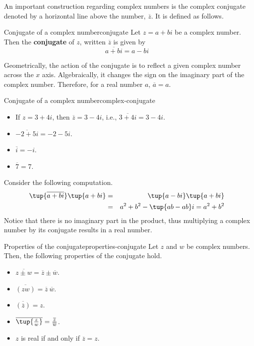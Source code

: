 An important construction regarding complex numbers is the complex
conjugate denoted by a horizontal line above the number, $\overline{z}$. It
is defined as follows.

\begin{definition}{Conjugate of a complex number}{conjugate}
Let $z = a+bi$ be a complex number. Then the \textbf{conjugate} of $z$, written $\overline{z}$ is given by 
\begin{equation*}
\overline{a+bi}= a-bi
\end{equation*}
\end{definition}

Geometrically, the action of the conjugate is to reflect a given complex number across the $x$ axis.
Algebraically, it changes the sign on the imaginary part of the complex number. Therefore, for a real number $a$, $\overline{a} = a$. 

\begin{example}{Conjugate of a complex number}{complex-conjugate}
\begin{itemize}

\item If $z=3+4i$, then $\overline{z}=3-4i$,
i.e., $\overline{3+4i}=3-4i$.

\item $\overline{-2+5i}= -2-5i$.

\item $\overline{i}= -i$.

\item $\overline{7}= 7$.
\end{itemize}
\end{example}

Consider the following computation. 
\begin{eqnarray*}
\tup{\overline{a+bi}} \tup{a+bi} &=&\tup{a-bi}
\tup{a+bi} \\
&=&a^{2}+b^{2}-\tup{ab-ab}i =a^{2}+b^{2}
\end{eqnarray*}
Notice that there is no imaginary part in the product, thus
multiplying a complex number by its conjugate results in  a real number.

\begin{theorem}{Properties of the conjugate}{properties-conjugate}
Let $z$ and $w$ be complex numbers. Then, the following properties of the conjugate hold.

\begin{itemize}
\item
$\overline{z\pm w} = \overline{z} \pm \overline{w}$.
\item
$\overline{(zw)} = \overline{z}~ \overline{w}$.
\item
$\overline{(\overline{z})}=z$.
\item
$\overline{\tup{\frac{z}{w}}} =
\frac{\overline{z}}{\overline{w}}$.
\item
$z$ is real if and only if $\overline{z}=z$.
\end{itemize}
\end{theorem}

